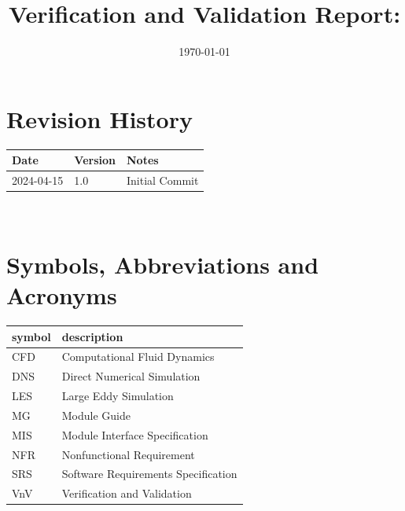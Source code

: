 \documentclass[12pt, titlepage]{article}
\begin{document}
\title{Verification and Validation Report: \progname} 
\author{\authname}
\date{\today}
	
\maketitle


\section{Revision History}

\begin{tabularx}{\textwidth}{p{3cm}p{2cm}X}
\toprule {\bf Date} & {\bf Version} & {\bf Notes}\\
\midrule
2024-04-15 & 1.0 & Initial Commit\\
\bottomrule
\end{tabularx}

~\newpage

\section{Symbols, Abbreviations and Acronyms}

\renewcommand{\arraystretch}{1.2}
\begin{tabular}{l l} 
  \toprule		
  \textbf{symbol} & \textbf{description}\\
  \midrule 
  CFD & Computational Fluid Dynamics\\
  DNS & Direct Numerical Simulation\\
  LES & Large Eddy Simulation\\
  MG  & Module Guide\\
  MIS & Module Interface Specification\\
  NFR & Nonfunctional Requirement\\
  SRS & Software Requirements Specification\\
  VnV & Verification and Validation\\
  \bottomrule
\end{tabular}\\


\newpage

\tableofcontents

\listoftables %

\listoffigures %
\end{document}
